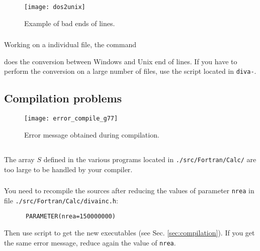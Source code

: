 \begin{figure}[htpb]
\centering
\texttt{[image: dos2unix]}
\caption{Example of bad ends of lines.\label{fig:error_dos2unix2}}
\end{figure}


\subsubsection{\answer}

Working on a individual file, the command\\


does the conversion between Windows and Unix end of lines.
If you have to perform the conversion on a large number of files, use the script  located in \texttt{diva-\divaversion}.



\subsection{Compilation problems\label{sec:error_compile}}


\begin{figure}[htpb]
\centering
\texttt{[image: error\_compile\_g77]}
\caption{Error message obtained during compilation. \label{fig:error_compile}}
\end{figure}

\subsection{\question}

The array $S$ defined in the various programs located in \texttt{./src/Fortran/Calc/} are too large to be handled by your compiler. 


\subsubsection{\answer}

You need to recompile the sources after reducing the values of parameter \texttt{nrea} in file \texttt{./src/Fortran/Calc/divainc.h}:
\begin{verbatim}
      PARAMETER(nrea=150000000)
\end{verbatim}
Then use script  to get the new executables (see Sec. \ref{sec:compilation}). If you get the same error message, reduce again the value of \texttt{nrea}.

